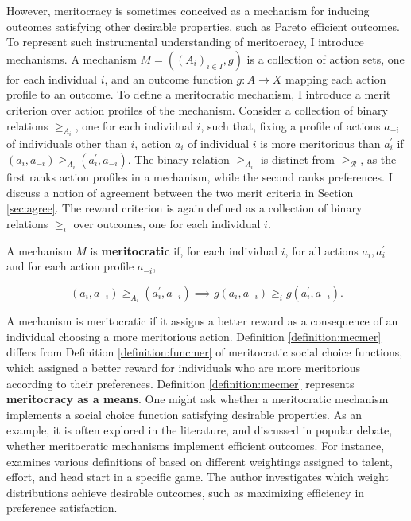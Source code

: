 However, meritocracy is sometimes conceived as a mechanism for inducing outcomes satisfying other desirable properties, such as Pareto efficient outcomes. To represent such instrumental understanding of meritocracy, I introduce mechanisms. A mechanism \( M = ( ( A_i )_{i \in I}, g ) \) is a collection of action sets, one for each individual \( i \), and an outcome function  \( g \colon A \rightarrow X \) mapping each action profile to an outcome. To define a meritocratic mechanism, I introduce a merit criterion over action profiles of the mechanism. Consider a collection of binary relations \( \geq_{A_i} \), one for each individual \( i \), such that, fixing a profile of actions \( a_{-i} \) of individuals other than \( i \), action \( a_i \) of individual \( i \) is more meritorious than \( a_i^{\prime} \) if \( ( a_i, a_{-i} ) \geq_{A_i} ( a_i^{\prime}, a_{-i} ) \). The binary relation \( \geq_{A_i} \) is distinct from \( \geq_{\mathcal{R}} \), as the first ranks action profiles in a mechanism, while the second ranks preferences. I discuss a notion of agreement between the two merit criteria in Section \ref{sec:agree}. The reward criterion is again defined as a collection of binary relations \( \geq_i \) over outcomes, one for each individual \( i \).

\begin{definition}\label{definition:mecmer}
	A mechanism \( M \) is \textbf{meritocratic} if, for each individual \( i \), for all actions \( a_i, a_i^{\prime} \) and for each action profile \( a_{-i} \),

	\[ ( a_i, a_{-i} ) \geq_{A_i} ( a^{\prime}_i, a_{-i} ) \implies g ( a_i, a_{-i} ) \geq_i g ( a^{\prime}_i, a_{-i} ) .\]
\end{definition}

A mechanism is meritocratic if it assigns a better reward as a consequence of an individual choosing a more meritorious action. Definition \ref{definition:mecmer} differs from Definition \ref{definition:funcmer} of meritocratic social choice functions, which assigned a better reward for individuals who are more meritorious according to their preferences. Definition \ref{definition:mecmer} represents \textbf{meritocracy as a means}. One might ask whether a meritocratic mechanism implements a social choice function satisfying desirable properties. As an example, it is often explored in the literature, and discussed in popular debate, whether meritocratic mechanisms implement efficient outcomes. For instance, \cite{moisson2024meritocracy} examines various definitions of  based on different weightings assigned to talent, effort, and head start in a specific game. The author investigates which weight distributions achieve desirable outcomes, such as maximizing efficiency in preference satisfaction.

